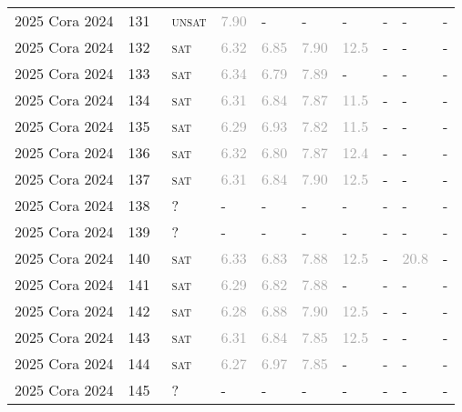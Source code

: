 \begin{center}
{\begin{longtable}{@{}llllllllll@{}}
2025 Cora 2024 & 131 & ~\textsc{unsat} & \textcolor{darkgray}{7.90} & - & - & - & - & - & - \\
2025 Cora 2024 & 132 & ~\textsc{sat} & \textcolor{darkgray}{6.32} & \textcolor{darkgray}{6.85} & \textcolor{darkgray}{7.90} & \textcolor{darkgray}{12.5} & - & - & - \\
2025 Cora 2024 & 133 & ~\textsc{sat} & \textcolor{darkgray}{6.34} & \textcolor{darkgray}{6.79} & \textcolor{darkgray}{7.89} & - & - & - & - \\
2025 Cora 2024 & 134 & ~\textsc{sat} & \textcolor{darkgray}{6.31} & \textcolor{darkgray}{6.84} & \textcolor{darkgray}{7.87} & \textcolor{darkgray}{11.5} & - & - & - \\
2025 Cora 2024 & 135 & ~\textsc{sat} & \textcolor{darkgray}{6.29} & \textcolor{darkgray}{6.93} & \textcolor{darkgray}{7.82} & \textcolor{darkgray}{11.5} & - & - & - \\
2025 Cora 2024 & 136 & ~\textsc{sat} & \textcolor{darkgray}{6.32} & \textcolor{darkgray}{6.80} & \textcolor{darkgray}{7.87} & \textcolor{darkgray}{12.4} & - & - & - \\
2025 Cora 2024 & 137 & ~\textsc{sat} & \textcolor{darkgray}{6.31} & \textcolor{darkgray}{6.84} & \textcolor{darkgray}{7.90} & \textcolor{darkgray}{12.5} & - & - & - \\
2025 Cora 2024 & 138 & ~? & - & - & - & - & - & - & - \\
2025 Cora 2024 & 139 & ~? & - & - & - & - & - & - & - \\
2025 Cora 2024 & 140 & ~\textsc{sat} & \textcolor{darkgray}{6.33} & \textcolor{darkgray}{6.83} & \textcolor{darkgray}{7.88} & \textcolor{darkgray}{12.5} & - & \textcolor{darkgray}{20.8} & - \\
2025 Cora 2024 & 141 & ~\textsc{sat} & \textcolor{darkgray}{6.29} & \textcolor{darkgray}{6.82} & \textcolor{darkgray}{7.88} & - & - & - & - \\
2025 Cora 2024 & 142 & ~\textsc{sat} & \textcolor{darkgray}{6.28} & \textcolor{darkgray}{6.88} & \textcolor{darkgray}{7.90} & \textcolor{darkgray}{12.5} & - & - & - \\
2025 Cora 2024 & 143 & ~\textsc{sat} & \textcolor{darkgray}{6.31} & \textcolor{darkgray}{6.84} & \textcolor{darkgray}{7.85} & \textcolor{darkgray}{12.5} & - & - & - \\
2025 Cora 2024 & 144 & ~\textsc{sat} & \textcolor{darkgray}{6.27} & \textcolor{darkgray}{6.97} & \textcolor{darkgray}{7.85} & - & - & - & - \\
2025 Cora 2024 & 145 & ~? & - & - & - & - & - & - & - \\

\end{longtable}}
\end{center}
